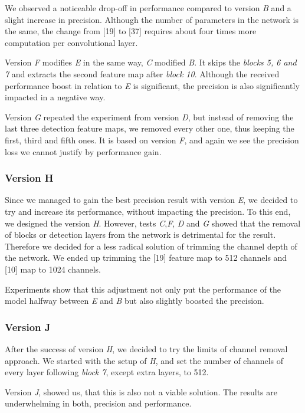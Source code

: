 We observed a noticeable drop-off in performance compared to version \textit{B} and a slight increase in precision. Although the number of parameters in the network is the same, the change from [19] to [37] requires about four times more computation per convolutional layer.

Version \textit{F} modifies \textit{E} in the same way, \textit{C} modified \textit{B}. It skips the \textit{blocks 5, 6 and 7} and extracts the second feature map after \textit{block 10}. Although the received performance boost in relation to \textit{E} is significant, the precision is also significantly impacted in a negative way.

Version \textit{G} repeated the experiment from version \textit{D}, but instead of removing the last three detection feature maps, we removed every other one, thus keeping the first, third and fifth ones. It is based on version \textit{F}, and again we see the precision loss we cannot justify by performance gain.

\subsubsection{Version H}
Since we managed to gain the best precision result with version \textit{E}, we decided to try and increase its performance, without impacting the precision. To this end, we designed the version \textit{H}. However, tests \textit{C},\textit{F}, \textit{D} and \textit{G} showed that the removal of blocks or detection layers from the network is detrimental for the result. Therefore we decided for a less radical solution of trimming the channel depth of the network. We ended up trimming the [19] feature map to 512 channels and [10] map to 1024 channels.

Experiments show that this adjustment not only put the performance of the model halfway between \textit{E} and \textit{B} but also slightly boosted the precision.

\subsubsection{Version J}
After the success of version \textit{H}, we decided to try the limits of channel removal approach. We started with the setup of \textit{H}, and set the number of channels of every layer following \textit{block 7}, except extra layers, to 512. 

Version \textit{J}, showed us, that this is also not a viable solution. The results are underwhelming in both, precision and performance.


